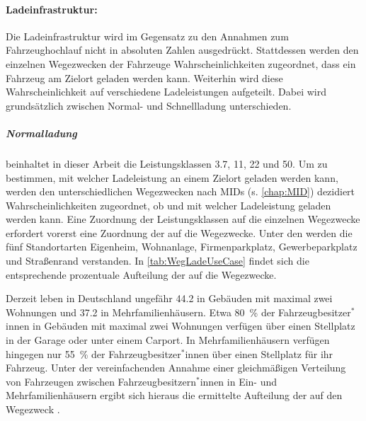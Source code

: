 


\paragraph{Ladeinfrastruktur:}

Die Ladeinfrastruktur wird im Gegensatz zu den Annahmen zum Fahrzeughochlauf nicht in absoluten Zahlen ausgedrückt.
Stattdessen werden den einzelnen Wegezwecken der Fahrzeuge Wahrscheinlichkeiten zugeordnet, dass ein Fahrzeug am Zielort geladen werden kann.
Weiterhin wird diese Wahrscheinlichkeit auf verschiedene Ladeleistungen aufgeteilt.
Dabei wird grundsätzlich zwischen Normal- und Schnellladung unterschieden.


\subparagraph{Normalladung} beinhaltet in dieser Arbeit die Leistungsklassen \SI{3.7}{\kw}, \SI{11}{\kw}, \SI{22}{\kw} und \SI{50}{\kw}.
Um zu bestimmen, mit welcher Ladeleistung an einem Zielort geladen werden kann, werden den unterschiedlichen Wegezwecken nach \glspl{MID} (s. \autoref{chap:MID}) dezidiert Wahrscheinlichkeiten zugeordnet, ob und mit welcher Ladeleistung geladen werden kann.
Eine Zuordnung der Leistungsklassen auf die einzelnen Wegezwecke erfordert vorerst eine Zuordnung der \UCs auf die Wegezwecke.
Unter den \UCs werden die fünf Standortarten Eigenheim, Wohnanlage, Firmenparkplatz, Gewerbeparkplatz und Straßenrand verstanden.
In \autoref{tab:WegLadeUseCase} findet sich die entsprechende prozentuale Aufteilung der \UCs auf die Wegezwecke.



Derzeit leben in Deutschland ungefähr \SI{44.2}{\MioMen} in Gebäuden mit maximal zwei Wohnungen und \SI{37.2}{\MioMen} in Mehrfamilienhäusern.
Etwa \SI{80}{\percent} der Fahrzeugbesitzer$^*$innen in Gebäuden mit maximal zwei Wohnungen verfügen über einen Stellplatz in der Garage oder unter einem Carport.
In Mehrfamilienhäusern verfügen hingegen nur \SI{55}{\percent} der Fahrzeugbesitzer$^*$innen über einen Stellplatz für ihr Fahrzeug. \cite{dena2020}
Unter der vereinfachenden Annahme einer gleichmäßigen Verteilung von Fahrzeugen zwischen Fahrzeugbesitzern$^*$innen in Ein- und Mehrfamilienhäusern ergibt sich hieraus die ermittelte Aufteilung der \UCs auf den Wegezweck \nHdot.\medskip

